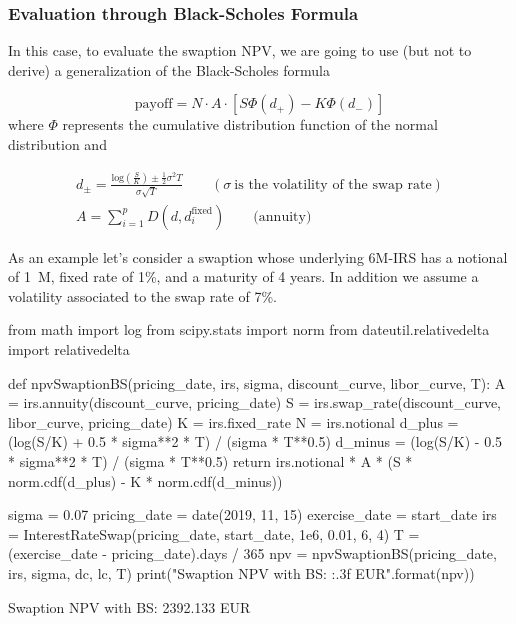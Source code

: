 \subsubsection{Evaluation through Black-Scholes Formula}
\label{evaluation-through-black-scholes-formula}

In this case, to evaluate the swaption NPV, we are going to use (but not to derive) a generalization of the Black-Scholes formula

\begin{equation}
\mathrm{payoff} = N\cdot A\cdot [S \Phi(d_+) - K\Phi(d_-)]
\end{equation}
where $\Phi$ represents the cumulative distribution function of the normal distribution and

\begin{equation}
\begin{gathered}d_{\pm} = \frac{\mathrm{log}(\frac{S}{K}) \pm \frac{1}{2}\sigma^{2}T}{\sigma\sqrt{T}}\qquad(\sigma~\textrm{is the volatility of the swap rate})\\
A =\sum_{i=1}^{p}D(d, d_{i}^{\mathrm{fixed}})\qquad\mathrm{(annuity})
\end{gathered}
\end{equation}

As an example let's consider a swaption whose underlying 6M-IRS has a notional of 1~M, fixed rate of 1\%, and a maturity of 4 years. In addition we assume a volatility associated to the swap rate of 7\%.

\begin{ipython}
from math import log
from scipy.stats import norm
from dateutil.relativedelta import relativedelta

def npvSwaptionBS(pricing_date, irs, sigma, discount_curve, libor_curve, T):
    A = irs.annuity(discount_curve, pricing_date)
    S = irs.swap_rate(discount_curve, libor_curve, pricing_date)
    K = irs.fixed_rate
    N = irs.notional
    d_plus = (log(S/K) + 0.5 * sigma**2 * T) / (sigma * T**0.5)
    d_minus = (log(S/K) - 0.5 * sigma**2 * T) / (sigma * T**0.5)
    return irs.notional * A * (S * norm.cdf(d_plus) - K * norm.cdf(d_minus))

sigma = 0.07
pricing_date = date(2019, 11, 15)
exercise_date = start_date
irs = InterestRateSwap(pricing_date, start_date, 1e6, 0.01, 6, 4)
T = (exercise_date - pricing_date).days / 365
npv = npvSwaptionBS(pricing_date, irs, sigma, dc, lc, T)
print("Swaption NPV with BS: {:.3f} EUR".format(npv))
\end{ipython}
\begin{ioutput}
Swaption NPV with BS: 2392.133 EUR
\end{ioutput}

